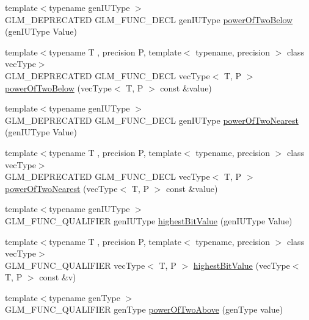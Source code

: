 \begin{DoxyCompactItemize}
{\footnotesize template$<$typename gen\+I\+U\+Type $>$ }\\G\+L\+M\+\_\+\+D\+E\+P\+R\+E\+C\+A\+T\+E\+D G\+L\+M\+\_\+\+F\+U\+N\+C\+\_\+\+D\+E\+C\+L gen\+I\+U\+Type \hyperlink{group__gtx__bit_ga3de7df63c589325101a2817a56f8e29d}{power\+Of\+Two\+Below} (gen\+I\+U\+Type Value)
\item 
{\footnotesize template$<$typename T , precision P, template$<$ typename, precision $>$ class vec\+Type$>$ }\\G\+L\+M\+\_\+\+D\+E\+P\+R\+E\+C\+A\+T\+E\+D G\+L\+M\+\_\+\+F\+U\+N\+C\+\_\+\+D\+E\+C\+L vec\+Type$<$ T, P $>$ \hyperlink{group__gtx__bit_gae33bb1ca2b55846b23a0f0796a679195}{power\+Of\+Two\+Below} (vec\+Type$<$ T, P $>$ const \&value)
\item 
{\footnotesize template$<$typename gen\+I\+U\+Type $>$ }\\G\+L\+M\+\_\+\+D\+E\+P\+R\+E\+C\+A\+T\+E\+D G\+L\+M\+\_\+\+F\+U\+N\+C\+\_\+\+D\+E\+C\+L gen\+I\+U\+Type \hyperlink{group__gtx__bit_ga5f65973a5d2ea38c719e6a663149ead9}{power\+Of\+Two\+Nearest} (gen\+I\+U\+Type Value)
\item 
{\footnotesize template$<$typename T , precision P, template$<$ typename, precision $>$ class vec\+Type$>$ }\\G\+L\+M\+\_\+\+D\+E\+P\+R\+E\+C\+A\+T\+E\+D G\+L\+M\+\_\+\+F\+U\+N\+C\+\_\+\+D\+E\+C\+L vec\+Type$<$ T, P $>$ \hyperlink{group__gtx__bit_ga2d7e85995d097518b8d70cd409bda39e}{power\+Of\+Two\+Nearest} (vec\+Type$<$ T, P $>$ const \&value)
\item 
{\footnotesize template$<$typename gen\+I\+U\+Type $>$ }\\G\+L\+M\+\_\+\+F\+U\+N\+C\+\_\+\+Q\+U\+A\+L\+I\+F\+I\+E\+R gen\+I\+U\+Type \hyperlink{group__gtx__bit_ga0dcc8fe7c3d3ad60dea409281efa3d05}{highest\+Bit\+Value} (gen\+I\+U\+Type Value)
\item 
{\footnotesize template$<$typename T , precision P, template$<$ typename, precision $>$ class vec\+Type$>$ }\\G\+L\+M\+\_\+\+F\+U\+N\+C\+\_\+\+Q\+U\+A\+L\+I\+F\+I\+E\+R vec\+Type$<$ T, P $>$ \hyperlink{group__gtx__bit_ga5eea3a4d429040af13d39a7d7cd84d73}{highest\+Bit\+Value} (vec\+Type$<$ T, P $>$ const \&v)
\item 
{\footnotesize template$<$typename gen\+Type $>$ }\\G\+L\+M\+\_\+\+F\+U\+N\+C\+\_\+\+Q\+U\+A\+L\+I\+F\+I\+E\+R gen\+Type \hyperlink{namespaceglm_a4f29a0e902ea0e3a76fc10c5b0ef31b6}{power\+Of\+Two\+Above} (gen\+Type value)
\item 

\end{DoxyCompactItemize}

